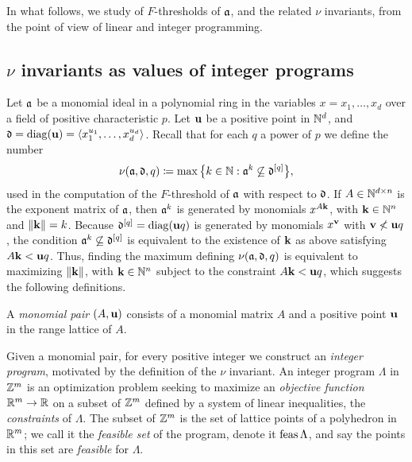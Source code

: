 \documentclass[11pt]{amsart}
\begin{document}
In what follows, we study of $F$-thresholds of $\mathfrak{a}$, and the related $\nu$ invariants, from the point of view of linear and integer programming.

\subsection{$\nu$ invariants as values of integer programs}

Let $\mathfrak{a}$ be a monomial ideal in a polynomial ring in the variables $x=x_1,\ldots,x_d$ over a field of positive characteristic $p$.
Let $\mathbf{u}$ be a positive point in $\mathbb{N}^d$, and $\mathfrak{d} = \operatorname{diag}(\mathbf{u}) = \langle x_1^{u_1},\ldots,x_d^{u_d} \rangle$.
Recall that for each $q$ a power of $p$ we define the number
\[\nu(\mathfrak{a},\mathfrak{d},q) \coloneqq \max\big\{k\in \mathbb{N} : \mathfrak{a}^{k} \not\subseteq \mathfrak{d}^{[q]}\big\},\]
used in the computation of the $F$-threshold of $\mathfrak{a}$ with respect to $\mathfrak{d}$.
If $A \in \mathbb{N}^{d\times n}$ is the exponent matrix of $\mathfrak{a}$, then $\mathfrak{a}^k$ is generated by monomials $x^{A\mathbf{k}}$, with $\mathbf{k}\in \mathbb{N}^n$ and $\| \mathbf{k} \| = k$.
Because $\mathfrak{d}^{[q]} = \operatorname{diag}(\mathbf{u}q)$ is generated by monomials $x^{\mathbf{v}}$ with $\mathbf{v} \not< \mathbf{u}q$, the condition $\mathfrak{a}^{k} \not\subseteq \mathfrak{d}^{[q]}$ is equivalent to the existence of $\mathbf{k}$ as above satisfying $A\mathbf{k} < \mathbf{u}q$.
Thus, finding the maximum defining $\nu(\mathfrak{a},\mathfrak{d},q)$ is equivalent to maximizing $\| \mathbf{k} \|$, with $\mathbf{k} \in \mathbb{N}^n$ subject to the constraint $A\mathbf{k} < \mathbf{u}q$, which suggests the following definitions.

\begin{definition}
   A \emph{monomial pair} $(A, \mathbf{u})$ consists of a monomial matrix $A$ and a positive point $\mathbf{u}$ in the range lattice of $A$.
\end{definition}

Given a monomial pair, for every positive integer we construct an \emph{integer program}, motivated by the definition of the $\nu$ invariant.
An integer program $\Lambda$ in $\mathbb{Z}^m$ is an optimization problem seeking to maximize an \emph{objective function} $\mathbb{R}^m \to \mathbb{R}$ on a subset of $\mathbb{Z}^m$ defined by a system
of linear inequalities, the \emph{constraints} of $\Lambda$. The subset of $\mathbb{Z}^m$ is the set of lattice points of a polyhedron in $\mathbb{R}^m$; we call it
 the \emph{feasible set} of the program, denote it $\operatorname{feas} \Lambda$,
and say the points in this set are \emph{feasible} for $\Lambda$.
\end{document}
